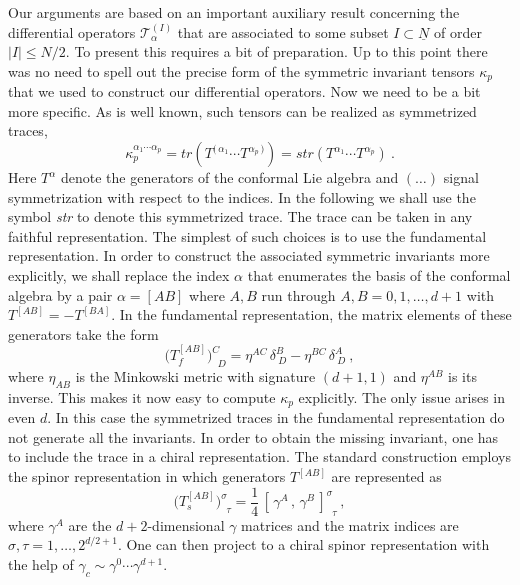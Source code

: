 \documentclass{article}
\begin{document}
Our arguments are based on an important auxiliary result concerning the 
differential operators $\mathcal{T}^{(I)}_\alpha$ that are associated to 
some subset $I \subset \underline N$ of order $|I| \leq N/2$. To present 
this requires a bit of preparation. Up to this point there was no need to 
spell out the precise form of the symmetric invariant tensors $\kappa_p$
that we used to construct our differential operators. Now we need to be a 
bit more specific. As is well known, such tensors can be realized as 
symmetrized traces,  
\begin{equation} 
\kappa^{\alpha_1 \cdots \alpha_p}_p = \textit{tr} 
\left( T^{(\, \alpha_1} \cdots T^{\alpha_p \,)}\right) 
= \textit{str} 
\left( T^{\alpha_1} \cdots T^{\alpha_p}\right)\ . 
\end{equation} 
Here $T^\alpha$ denote the generators of the conformal Lie algebra and 
$( \dots )$ signal symmetrization with respect to the indices. In the 
following we shall use the symbol \textit{str} to denote this symmetrized 
trace. The trace can be taken in any faithful representation. The simplest 
of such choices is to use the fundamental representation. In order to 
construct the associated symmetric invariants more explicitly, we shall 
replace the index $\alpha$ that enumerates the basis of the conformal algebra 
by a pair $\alpha = [AB]$ where $A,B$ run through $A,B = 0,1, \dots, 
d+1$ with $T^{[AB]} = - T^{[BA]}$. In the fundamental representation, 
the matrix elements of these generators take the form 
$$ \bigl( T^{[AB]}_{f} \bigr)^{C}_{\;\;D} = \eta^{AC}\,  \delta^B_{\ D} - \eta^{BC}\,  \delta^A_{\ D} \ , $$
where $\eta_{AB}$ is the Minkowski metric with signature $(d+1,1)$ and $\eta^{AB}$ is its inverse. This makes it now easy to compute $\kappa_p$ explicitly. The only issue 
arises in even $d$. In this case the symmetrized traces in the fundamental 
representation do not generate all the invariants. In order to obtain the 
missing invariant, one has to include the trace in a chiral representation. 
The standard construction employs the spinor representation in which 
generators $T^{[AB]}$ are represented as 
$$ \bigl( T^{[AB]}_{s} \bigr)^{\sigma}_{\;\;\tau} =  
\frac14\,  [\, \gamma^A\, ,\, \gamma^B\, ]^{\sigma}_{\;\;\tau}  \ ,$$ 
where $\gamma^A$ are the $d+2$-dimensional $\gamma$ matrices and the 
matrix indices are $\sigma,\tau = 1, \dots, 2^{d/2+1}$. One can then project to 
a chiral spinor representation with the help of $\gamma_c \sim \gamma^0 
\cdots \gamma^{d+1}$.  
\smallskip 
\end{document}
